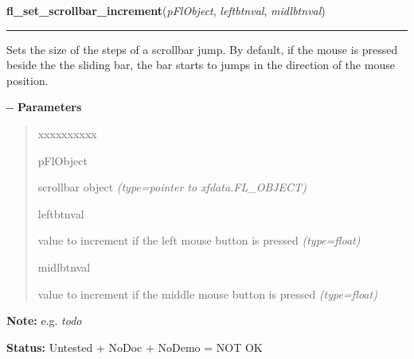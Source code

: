 \hspace{.8\funcindent}\begin{boxedminipage}{\funcwidth}

    \raggedright \textbf{fl\_set\_scrollbar\_increment}(\textit{pFlObject}, \textit{leftbtnval}, \textit{midlbtnval})

    \vspace{-1.5ex}

    \rule{\textwidth}{0.5\fboxrule}
\setlength{\parskip}{2ex}

Sets the size of the steps of a scrollbar jump. By default, if the
mouse is pressed beside the the sliding bar, the bar starts to jumps in
the direction of the mouse position.

-{}-
\setlength{\parskip}{1ex}
      \textbf{Parameters}
      \vspace{-1ex}

      \begin{quote}
        \begin{Ventry}{xxxxxxxxxx}

          \item[pFlObject]


scrollbar object
            {\it (type=pointer to xfdata.FL\_OBJECT)}

          \item[leftbtnval]


value to increment if the left mouse button is pressed
            {\it (type=float)}

          \item[midlbtnval]


value to increment if the middle mouse button is pressed
            {\it (type=float)}

        \end{Ventry}

      \end{quote}

\textbf{Note:} 
e.g. \emph{todo}


\textbf{Status:} 
Untested + NoDoc + NoDemo = NOT OK


    \end{boxedminipage}

    \label{xformslib:flscrollbar:fl_get_scrollbar_increment}

    \vspace{0.5ex}

